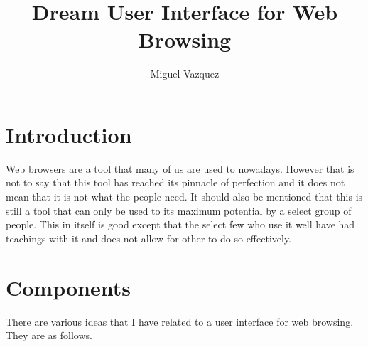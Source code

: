 \documentclass[11pt]{article}
\title{Dream User Interface for Web Browsing}
\author{Miguel Vazquez}
\begin{document}
\maketitle
\tableofcontents

\section{Introduction}
Web browsers are a tool that many of us are used to nowadays. However that is not to say that this tool has reached its pinnacle of perfection and it does not mean that it is not what the people need. It should also be mentioned that this is still a tool that can only be used to its maximum potential by a select group of people. This in itself is good except that the select few who use it well have had teachings with it and does not allow for other to do so effectively. 

\section{Components}
There are various ideas that I have related to a user interface for web browsing. They are as follows.
\end{document}
